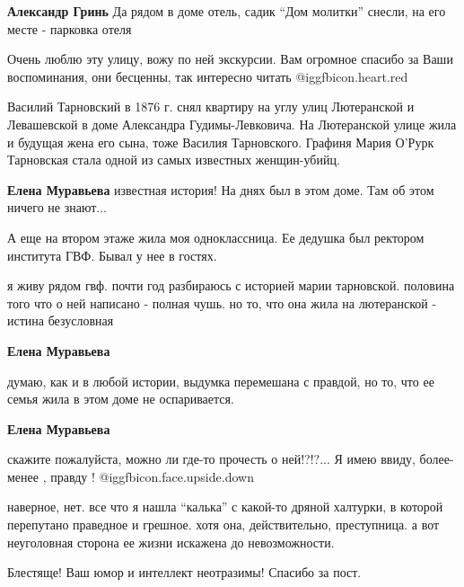 \begin{itemize}
\begin{itemize}
\textbf{Александр Гринь} Да рядом в доме отель, садик \enquote{Дом молитки} снесли, на его месте - парковка отеля
\end{itemize} %


Очень люблю эту улицу, вожу по ней экскурсии. Вам огромное спасибо за Ваши
воспоминания, они бесценны, так интересно читать @igg{fbicon.heart.red}


Василий Тарновский в 1876 г. снял квартиру на углу улиц Лютеранской и
Левашевской в доме Александра Гудимы-Левковича. На Лютеранской улице жила и
будущая жена его сына, тоже Василия Тарновского. Графиня Мария О'Рурк Тарновская
стала одной из самых известных женщин-убийц.

\begin{itemize} %
\textbf{Елена Муравьева} известная история! На днях был в этом доме. Там об этом ничего не знают...


А еще на втором этаже жила моя одноклассница. Ее дедушка был ректором института
ГВФ. Бывал у нее в гостях.


я живу рядом гвф. почти год разбираюсь с историей марии тарновской. половина
того что о ней написано - полная чушь. но то, что она жила на лютеранской -
истина безусловная

\textbf{Елена Муравьева} 

думаю, как и в любой истории, выдумка перемешана с правдой, но то, что ее семья
жила в этом доме не оспаривается.

\textbf{Елена Муравьева} 

скажите пожалуйста, можно ли где-то прочесть о ней!?!?... Я имею ввиду, более-
менее , правду ! @igg{fbicon.face.upside.down} 


наверное, нет. все что я нашла \enquote{калька} с какой-то дряной халтурки, в которой
перепутано праведное и грешное. хотя она, действительно, преступница. а вот
неуголовная сторона ее жизни искажена до невозможности.


\end{itemize} %

Блестяще! Ваш юмор и интеллект неотразимы! Спасибо за пост.


\end{itemize}
